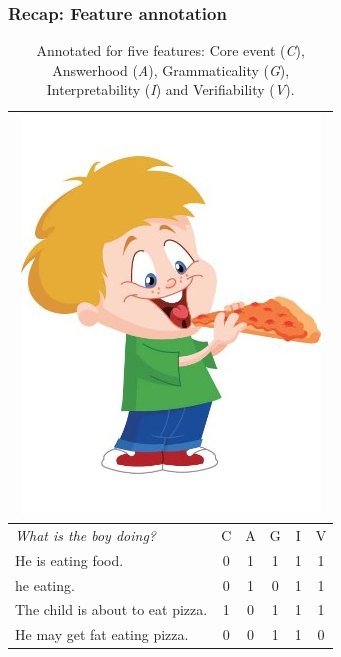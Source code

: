 \documentclass[xcolor={dvipsnames}]{beamer}
\begin{document}
\begin{frame}
\frametitle{Recap: Feature annotation}
\begin{table}[htb!]
\scriptsize
\begin{center}
\begin{tabular}{|l|c|c|c|c|c|}
\hline
\multicolumn{6}{|c|}{\includegraphics[width=0.3\columnwidth]{figures/I02.jpg}} \\
\hline
\textit{What is the boy doing?} & C & A & G & I & V \\
\hline
\hline
He is eating food. & 0 & 1 & 1 & 1 & 1 \\
\hline
he eating. & 0 & 1 & 0 & 1 & 1 \\
\hline
The child is about to eat pizza. & 1 & 0 & 1 & 1 & 1 \\
\hline
He may get fat eating pizza. & 0 & 0 & 1 & 1 & 0 \\
\hline
\end{tabular}
\caption{\label{tab:dev-transitive} \scriptsize Annotated for five features: Core event (\textit{C}), Answerhood (\textit{A}), Grammaticality (\textit{G}), Interpretability (\textit{I}) and Verifiability (\textit{V}).}
\end{center}
\end{table}

\end{frame}
\end{document}
